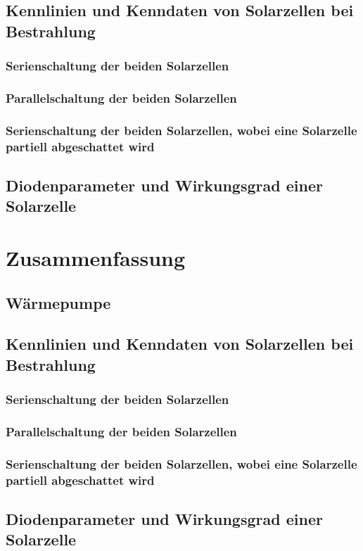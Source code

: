 \documentclass[12pt,english,ngerman]{scrartcl}
\begin{document}
\subsection{Kennlinien und Kenndaten von Solarzellen bei Bestrahlung}

\subsubsection{Serienschaltung der beiden Solarzellen}

\subsubsection{Parallelschaltung der beiden Solarzellen}

\subsubsection{Serienschaltung der beiden Solarzellen, wobei eine Solarzelle partiell abgeschattet wird}

\subsection{Diodenparameter und Wirkungsgrad einer Solarzelle}

\section{Zusammenfassung}\label{sec:zusammenfassung}

\subsection{Wärmepumpe}

\subsection{Kennlinien und Kenndaten von Solarzellen bei Bestrahlung}

\subsubsection{Serienschaltung der beiden Solarzellen}

\subsubsection{Parallelschaltung der beiden Solarzellen}

\subsubsection{Serienschaltung der beiden Solarzellen, wobei eine Solarzelle partiell abgeschattet wird}

\subsection{Diodenparameter und Wirkungsgrad einer Solarzelle}

\newpage
\listoffigures
\listoftables
\end{document}
